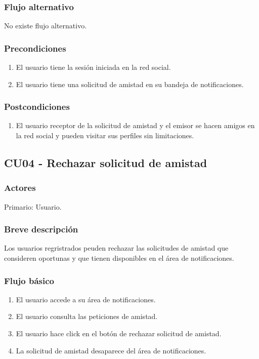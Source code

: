 \documentclass[12pt, a4paper, titlepage]{article}
\begin{document}
\subsubsection{Flujo alternativo}
No existe flujo alternativo.
\subsubsection{Precondiciones}
\begin{enumerate}
	\item El usuario tiene la sesión iniciada en la red social.
	\item El usuario tiene una solicitud de amistad en su bandeja de notificaciones.
\end{enumerate}
\subsubsection{Postcondiciones}
\begin{enumerate}
	\item El usuario receptor de la solicitud de amistad y el emisor se hacen amigos en la red social y pueden visitar sus perfiles sin limitaciones.
\end{enumerate}


\subsection{CU04 - Rechazar solicitud de amistad}
\subsubsection{Actores}
Primario: Usuario.
\subsubsection{Breve descripción}
Los usuarios regristrados peuden rechazar las solicitudes de amistad que consideren oportunas y que tienen disponibles en el área de notificaciones.
\subsubsection{Flujo básico}
\begin{enumerate}
	\item El usuario accede a su área de notificaciones.
	\item El usuario consulta las peticiones de amistad.
	\item El usuario hace click en el botón de rechazar solicitud de amistad.
	\item La solicitud de amistad desaparece del área de notificaciones.
\end{enumerate}
\end{document}
